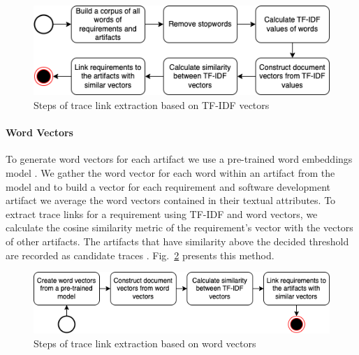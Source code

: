       \begin{figure}[htb]
        \centering
        \includegraphics[width=0.99\linewidth]{figs/tfidfvector2.png}
        \caption{Steps of trace link extraction based on TF-IDF vectors}
        \label{fig:tfidfvec}
      \end{figure}

      \paragraph{Word Vectors} To generate word vectors for each artifact we use a pre-trained word embeddings model . We gather the word vector for each word within an artifact from the model and to build a vector for each requirement and software development artifact we average the word vectors contained in their textual attributes. To extract trace links for a requirement using TF-IDF and word vectors, we calculate the cosine similarity metric of the requirement's vector with the vectors of other artifacts. The artifacts that have similarity above the decided threshold are recorded as candidate traces . Fig.~\ref{fig:wordvec} presents this method.

       \begin{figure}[htb]
        \centering
        \includegraphics[width=0.99\linewidth]{figs/wordvector.png}
        \caption{Steps of trace link extraction based on word vectors}
        \label{fig:wordvec}
      \end{figure}








